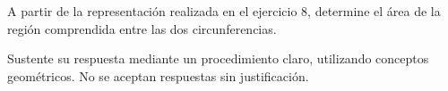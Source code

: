 A partir de la representación realizada en el ejercicio 8, determine el área de la región comprendida entre las dos circunferencias.

Sustente su respuesta mediante un procedimiento claro, utilizando conceptos geométricos. No se aceptan respuestas sin justificación.